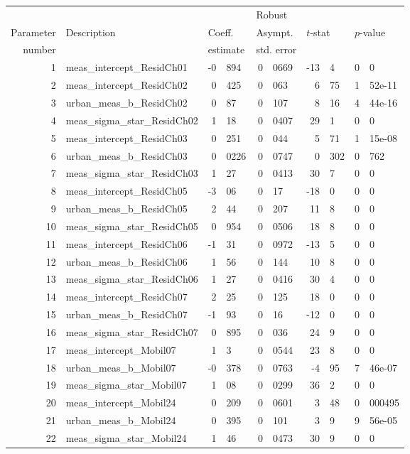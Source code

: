 \documentclass[12pt,a4paper]{article}
\begin{document}
\begin{table}[htb]
    \footnotesize
  \begin{center}
\begin{tabular}{rlr@{.}lr@{.}lr@{.}lr@{.}l}
  &              &   \multicolumn{2}{l}{}         & \multicolumn{2}{l}{Robust}  &  \multicolumn{4}{l}{}  \\
  Parameter & Description & \multicolumn{2}{l}{Coeff.} & \multicolumn{2}{l}{Asympt.} & \multicolumn{2}{l}{$t$-stat} & \multicolumn{2}{l}{$p$-value} \\
  number    &             & \multicolumn{2}{l}{estimate} & \multicolumn{2}{l}{std. error} & \multicolumn{2}{l}{} & \multicolumn{2}{l}{} \\
  \hline
1 & meas\_intercept\_ResidCh01 & -0&894 & 0&0669 & -13&4 & 0&0 \\ 
2 & meas\_intercept\_ResidCh02 & 0&425 & 0&063 & 6&75 & 1&52e-11 \\ 
3 & urban\_meas\_b\_ResidCh02 & 0&87 & 0&107 & 8&16 & 4&44e-16 \\ 
4 & meas\_sigma\_star\_ResidCh02 & 1&18 & 0&0407 & 29&1 & 0&0 \\ 
5 & meas\_intercept\_ResidCh03 & 0&251 & 0&044 & 5&71 & 1&15e-08 \\ 
6 & urban\_meas\_b\_ResidCh03 & 0&0226 & 0&0747 & 0&302 & 0&762 \\ 
7 & meas\_sigma\_star\_ResidCh03 & 1&27 & 0&0413 & 30&7 & 0&0 \\ 
8 & meas\_intercept\_ResidCh05 & -3&06 & 0&17 & -18&0 & 0&0 \\ 
9 & urban\_meas\_b\_ResidCh05 & 2&44 & 0&207 & 11&8 & 0&0 \\ 
10 & meas\_sigma\_star\_ResidCh05 & 0&954 & 0&0506 & 18&8 & 0&0 \\ 
11 & meas\_intercept\_ResidCh06 & -1&31 & 0&0972 & -13&5 & 0&0 \\ 
12 & urban\_meas\_b\_ResidCh06 & 1&56 & 0&144 & 10&8 & 0&0 \\ 
13 & meas\_sigma\_star\_ResidCh06 & 1&27 & 0&0416 & 30&4 & 0&0 \\ 
14 & meas\_intercept\_ResidCh07 & 2&25 & 0&125 & 18&0 & 0&0 \\ 
15 & urban\_meas\_b\_ResidCh07 & -1&93 & 0&16 & -12&0 & 0&0 \\ 
16 & meas\_sigma\_star\_ResidCh07 & 0&895 & 0&036 & 24&9 & 0&0 \\ 
17 & meas\_intercept\_Mobil07 & 1&3 & 0&0544 & 23&8 & 0&0 \\ 
18 & urban\_meas\_b\_Mobil07 & -0&378 & 0&0763 & -4&95 & 7&46e-07 \\ 
19 & meas\_sigma\_star\_Mobil07 & 1&08 & 0&0299 & 36&2 & 0&0 \\ 
20 & meas\_intercept\_Mobil24 & 0&209 & 0&0601 & 3&48 & 0&000495 \\ 
21 & urban\_meas\_b\_Mobil24 & 0&395 & 0&101 & 3&9 & 9&56e-05 \\ 
22 & meas\_sigma\_star\_Mobil24 & 1&46 & 0&0473 & 30&9 & 0&0 \\ 
  

\end{tabular}
\end{center}
\end{table}
\end{document}
